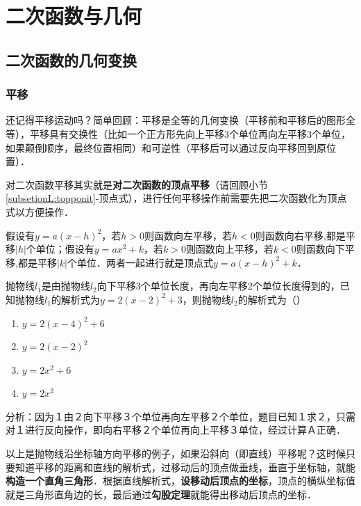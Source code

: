 \section{二次函数与几何}



\subsection{二次函数的几何变换}

\subsubsection*{平移}
还记得平移运动吗？简单回顾：平移是全等的几何变换（平移前和平移后的图形全等），平移具有交换性（比如一个正方形先向上平移3个单位再向左平移3个单位，如果颠倒顺序，最终位置相同）和可逆性（平移后可以通过反向平移回到原位置）．
\par
对二次函数平移其实就是\textbf{对二次函数的顶点平移}（请回顾小节\ref{subsetionL:topponit}-顶点式），进行任何平移操作前需要先把二次函数化为顶点式以方便操作．
\par
假设有\(y=a(x-h)^2\)，若\(h>0\)则函数向左平移，若\(h<0\)则函数向右平移,都是平移\(|h|\)个单位；假设有\(y=ax^2+k\)，若\(k>0\)则函数向上平移，若\(k<0\)则函数向下平移,都是平移\(|k|\)个单位．两者一起进行就是顶点式\(y=a(x-h)^2+k\)．
\par
\begin{example}抛物线\( l_1 \)是由抛物线\( l_2 \)向下平移3个单位长度，再向左平移2个单位长度得到的，已知抛物线\( l_1 \)的解析式为\( y=2(x-2)^2+3 \)，则抛物线\( l_2 \)的解析式为（\hspace{3.5em}）

\begin{enumerate}[label=\Alph*.]
    \item \( y=2(x-4)^2+6 \)
    \item \( y=2(x-2)^2 \)
    \item \( y=2x^2+6 \)
    \item \( y=2x^2 \)
\end{enumerate}
\end{example}
\begin{solution}
    分析：因为１由２向下平移３个单位再向左平移２个单位，题目已知１求２，只需对１进行反向操作，即向右平移２个单位再向上平移３单位，经过计算Ａ正确．
\end{solution}
以上是抛物线沿坐标轴方向平移的例子，如果沿斜向（即直线）平移呢？这时候只要知道平移的距离和直线的解析式，过移动后的顶点做垂线，垂直于坐标轴，就能\textbf{构造一个直角三角形}．根据直线解析式，\textbf{设移动后顶点的坐标}，顶点的横纵坐标值就是三角形直角边的长，最后通过\textbf{勾股定理}就能得出移动后顶点的坐标．
